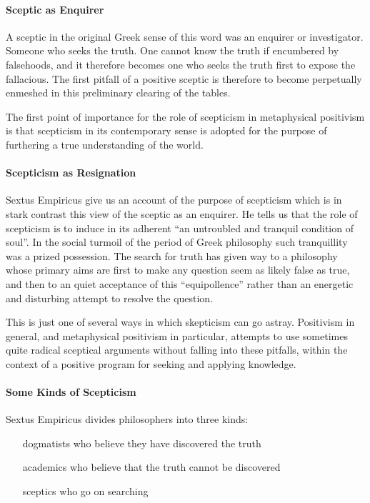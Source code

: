 \documentclass{rbjk}
\begin{document}
\begin{article}
\paragraph{Sceptic as Enquirer}

A sceptic in the original Greek sense of this word was an enquirer or investigator.
Someone who seeks the truth.
One cannot know the truth if encumbered by falsehoods, and it therefore becomes one who seeks the truth first to expose the fallacious.
The first pitfall of a positive sceptic is therefore to become perpetually enmeshed in this preliminary clearing of the tables.

The first point of importance for the role of scepticism in metaphysical positivism is that scepticism in its contemporary sense is adopted for the purpose of furthering a true understanding of the world.

\paragraph{Scepticism as Resignation}

Sextus Empiricus give us an account of the purpose of scepticism which is in stark contrast this view of the sceptic as an enquirer.
He tells us that the role of scepticism is to induce in its adherent ``an untroubled and tranquil condition of soul''.
In the social turmoil of the period of Greek philosophy such tranquillity was a prized possession.
The search for truth has given way to a philosophy whose primary aims are first to make any question seem as likely false as true, and then to an quiet acceptance of this ``equipollence'' rather than an energetic and disturbing attempt to resolve the question.

This is just one of several ways in which skepticism can go astray.
Positivism in general, and metaphysical positivism in particular, attempts to use sometimes quite radical sceptical arguments without falling into these pitfalls, within the context of a positive program for seeking and applying knowledge.

\paragraph{Some Kinds of Scepticism}

Sextus Empiricus divides philosophers into three kinds:

\begin{itemize}
\item[dogmatists] who believe they have discovered the truth
\item[academics] who believe that the truth cannot be discovered
\item[sceptics] who go on searching
\end{itemize}


\end{article}
\end{document}
